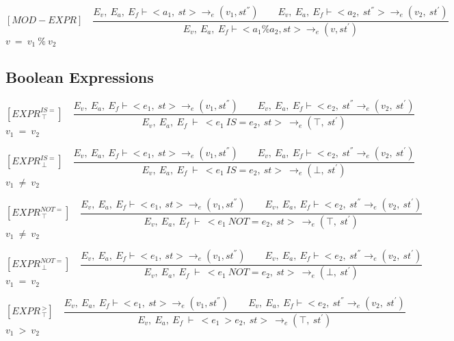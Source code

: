    	\[
   	[MOD-EXPR] \quad
   	\dfrac{E_v, \ E_a, \ E_f \vdash <a_1, \ st> \rightarrow_{e} (v_1, st^{''}) \qquad E_v, \ E_a, \ E_f \vdash <a_2, \ st^{''}> \rightarrow_e (v_2, \ st^{'})}{E_v, \ E_a, \ E_f \vdash <a_1 \% a_2, st> \rightarrow_{e} (v, st^{'})}
   	\]
   	\begin{math}
   	v \ = \ v_1 \ \% \ v_2
   	\end{math}   	

   	\subsection{Boolean Expressions}
   	\[
   	[EXPR^{IS=}_{\ \top}] \quad
   	\dfrac{E_v, \ E_a, \ E_f \vdash <e_1, \ st> \rightarrow_e (v_1, st^{''}) \qquad E_v, \ E_a, \ E_f \vdash <e_2, \ st^{''} \rightarrow_e (v_2, \ st^{'})}{E_v, \ E_a, \ E_f \ \vdash \ <e_1
   	\ IS= e_2, \ st> \ \rightarrow_e (\top, \ st^{'})}
   	\]
   	\begin{math}
   	v_1 \ = \ v_2 
   	\end{math}

   	\[
   	[EXPR^{IS=}_{\ \bot}] \quad
   	\dfrac{E_v, \ E_a, \ E_f \vdash <e_1, \ st> \rightarrow_e (v_1, st^{''}) \qquad E_v, \ E_a, \ E_f \vdash <e_2, \ st^{''} \rightarrow_e (v_2, \ st^{'})}{E_v, \ E_a, \ E_f \ \vdash \ <e_1
   	\ IS= e_2, \ st> \ \rightarrow_e (\bot, \ st^{'})}
   	\]
	\begin{math}
   	v_1 \ \not= \ v_2
   	\end{math}


   	\[
   	[EXPR^{NOT=}_{\ \top}] \quad
   	\dfrac{E_v, \ E_a, \ E_f \vdash <e_1, \ st> \rightarrow_e (v_1, st^{''}) \qquad E_v, \ E_a, \ E_f \vdash <e_2, \ st^{''} \rightarrow_e (v_2, \ st^{'})}{E_v, \ E_a, \ E_f \ \vdash \ <e_1 \ NOT= e_2, \ st> \ \rightarrow_e (\top, \ st^{'})}
   	\]
	\begin{math}
   	v_1 \ \not= \ v_2
   	\end{math}   	
   	

   	\[
   	[EXPR^{NOT=}_{\ \bot}] \quad
   	\dfrac{E_v, \ E_a, \ E_f \vdash <e_1, \ st> \rightarrow_e (v_1, st^{''}) \qquad E_v, \ E_a, \ E_f \vdash <e_2, \ st^{''} \rightarrow_e (v_2, \ st^{'})}{E_v, \ E_a, \ E_f \ \vdash \ <e_1 \ NOT= e_2, \ st> \ \rightarrow_e (\bot, \ st^{'})}
   	\]
	\begin{math}
   	v_1 \ = \ v_2
   	\end{math}   	
   	
   	
   	\[
   	[EXPR^{\ >}_{\ \top}] \quad
   	\dfrac{E_v, \ E_a, \ E_f \vdash <e_1, \ st> \rightarrow_e (v_1, st^{''}) \qquad E_v, \ E_a, \ E_f \vdash <e_2, \ st^{''} \rightarrow_e (v_2, \ st^{'})}{E_v, \ E_a, \ E_f \ \vdash \ <e_1 \ > e_2, \ st> \ \rightarrow_e (\top, \ st^{'})}
   	\]
	\begin{math}
   	v_1 \ > \ v_2
   	\end{math}   	
   	
